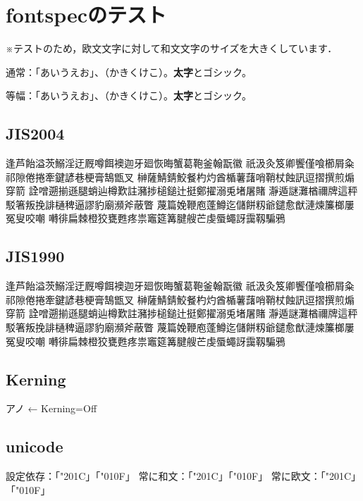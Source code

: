 \documentclass{article}
\begin{document}
\section{fontspecのテスト}

※テストのため，欧文文字に対して和文文字のサイズを大きくしています．

\noindent 通常：「あいうえお」、（かきくけこ）。{\bf 太字}と{\gt ゴシック}。

{
\noindent 等幅：「あいうえお」、（かきくけこ）。{\bf 太字}と{\gt ゴシック}。
}

\subsection{JIS2004}
逢芦飴溢茨鰯淫迂厩噂餌襖迦牙廻恢晦蟹葛鞄釜翰翫徽
祇汲灸笈卿饗僅喰櫛屑粂祁隙倦捲牽鍵諺巷梗膏鵠甑叉
榊薩鯖錆鮫餐杓灼酋楯薯藷哨鞘杖蝕訊逗摺撰煎煽穿箭
詮噌遡揃遜腿蛸辿樽歎註瀦捗槌鎚辻挺鄭擢溺兎堵屠賭
瀞遁謎灘楢禰牌這秤駁箸叛挽誹樋稗逼謬豹廟瀕斧蔽瞥
蔑篇娩鞭庖蓬鱒迄儲餅籾爺鑓愈猷漣煉簾榔屢冤叟咬嘲
囀徘扁棘橙狡甕甦疼祟竈筵篝腱艘芒虔蜃蠅訝靄靱騙鴉

\subsection{JIS1990}
{\ipajisninety
逢芦飴溢茨鰯淫迂厩噂餌襖迦牙廻恢晦蟹葛鞄釜翰翫徽
祇汲灸笈卿饗僅喰櫛屑粂祁隙倦捲牽鍵諺巷梗膏鵠甑叉
榊薩鯖錆鮫餐杓灼酋楯薯藷哨鞘杖蝕訊逗摺撰煎煽穿箭
詮噌遡揃遜腿蛸辿樽歎註瀦捗槌鎚辻挺鄭擢溺兎堵屠賭
瀞遁謎灘楢禰牌這秤駁箸叛挽誹樋稗逼謬豹廟瀕斧蔽瞥
蔑篇娩鞭庖蓬鱒迄儲餅籾爺鑓愈猷漣煉簾榔屢冤叟咬嘲
囀徘扁棘橙狡甕甦疼祟竈筵篝腱艘芒虔蜃蠅訝靄靱騙鴉
}

\vspace{1\zw}

\subsection{Kerning}
{

アノ ← Kerning=Off

}

\subsection{unicode}

設定依存：「\char"201C」「\char"010F」%
常に和文：「\ltjjachar"201C」「\ltjjachar"010F」%
常に欧文：「\ltjalchar"201C」「\ltjalchar"010F」%
\end{document}
